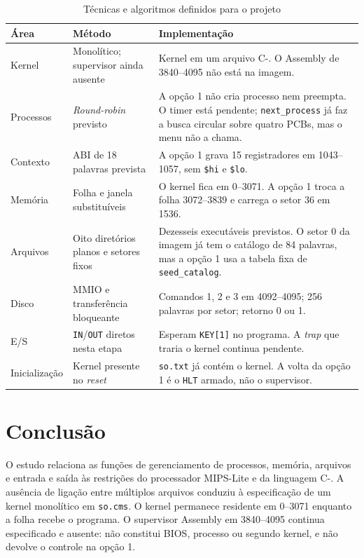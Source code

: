 \documentclass[
    12pt,
    openright,
    a4paper,
    english,
    brazilian
]{abntex2}
\begin{document}
\begin{table}[H]
\centering
\caption{Técnicas e algoritmos definidos para o projeto}
\label{tab:decisoes}
\small
\begin{tabular}{p{3.0cm}p{4.0cm}p{5.7cm}}
\toprule
\textbf{Área} & \textbf{Método} & \textbf{Implementação} \\
\midrule
Kernel & Monolítico; supervisor ainda ausente & Kernel em um arquivo C-. O Assembly de 3840--4095 não está na imagem. \\
Processos & \emph{Round-robin} previsto & A opção 1 não cria processo nem preempta. O timer está pendente; \texttt{next\_process} já faz a busca circular sobre quatro PCBs, mas o menu não a chama. \\
Contexto & ABI de 18 palavras prevista & A opção 1 grava 15 registradores em 1043--1057, sem \texttt{\$hi} e \texttt{\$lo}. \\
Memória & Folha e janela substituíveis & O kernel fica em 0--3071. A opção 1 troca a folha 3072--3839 e carrega o setor 36 em 1536. \\
Arquivos & Oito diretórios planos e setores fixos & Dezesseis executáveis previstos. O setor 0 da imagem já tem o catálogo de 84 palavras, mas a opção 1 usa a tabela fixa de \texttt{seed\_catalog}. \\
Disco & MMIO e transferência bloqueante & Comandos 1, 2 e 3 em 4092--4095; 256 palavras por setor; retorno 0 ou 1. \\
E/S & \texttt{IN}/\texttt{OUT} diretos nesta etapa & Esperam \texttt{KEY[1]} no programa. A \emph{trap} que traria o kernel continua pendente. \\
Inicialização & Kernel presente no \emph{reset} & \texttt{so.txt} já contém o kernel. A volta da opção 1 é o \texttt{HLT} armado, não o supervisor. \\
\bottomrule
\end{tabular}
\end{table}

\chapter{Conclusão}

O estudo relaciona as funções de gerenciamento de processos, memória, arquivos e entrada e saída às restrições do processador MIPS-Lite e da linguagem C-. A ausência de ligação entre múltiplos arquivos conduziu à especificação de um kernel monolítico em \texttt{so.cms}. O kernel permanece residente em 0--3071 enquanto a folha recebe o programa. O supervisor Assembly em 3840--4095 continua especificado e ausente: não constitui BIOS, processo ou segundo kernel, e não devolve o controle na opção 1.
\end{document}
